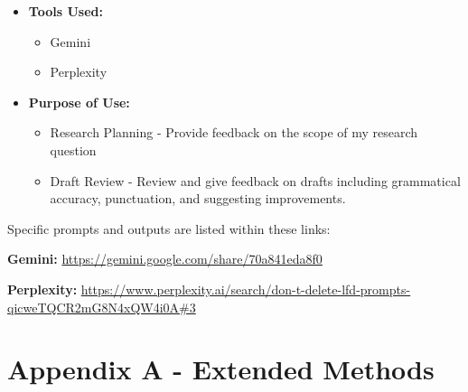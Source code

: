 \documentclass[english]{article}
\begin{document}
\vspace{-0.5em}

\begin{itemize}
\item \textbf{Tools Used:}
 
    \vspace{-0.5em}

    \begin{itemize}
        \item Gemini
        \item Perplexity
    \end{itemize}

    \vspace{-0.5em}

\item \textbf{Purpose of Use:}
 
    \vspace{-0.5em}

    \begin{itemize}
        \item Research Planning - Provide feedback on the scope of my research question
        \item Draft Review - Review and give feedback on drafts including grammatical accuracy, punctuation,
         and suggesting improvements.
    \end{itemize}

    \vspace{-0.5em}

\end{itemize}
   

Specific prompts and outputs are listed within these links:

\noindent \textbf{Gemini:} \url{https://gemini.google.com/share/70a841eda8f0}

\noindent \textbf{Perplexity:} \url{https://www.perplexity.ai/search/don-t-delete-lfd-prompts-qicweTQCR2mG8N4xQW4i0A#3}





\clearpage

\section*{Appendix A - Extended Methods}
\vspace{-1em}
\end{document}
